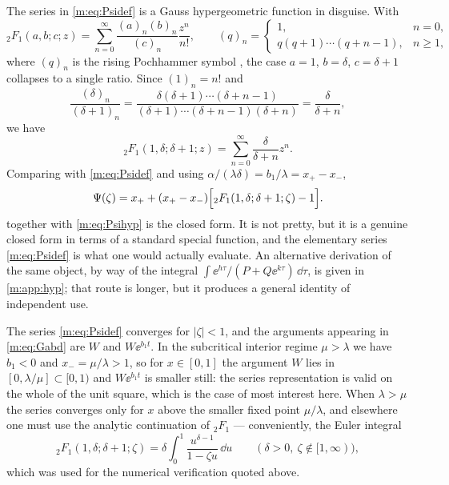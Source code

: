 The series in \cref{m:eq:Psidef} is a Gauss hypergeometric function in disguise. With
\begin{equation}
\label{m:eq:2F1def}
{}_2F_1(a,b;c;z) = \sum_{n=0}^{\infty}\frac{(a)_n(b)_n}{(c)_n}\frac{z^n}{n!},
\qquad
(q)_n = \begin{cases}1, & n=0,\\ q(q+1)\cdots(q+n-1), & n\ge1,\end{cases}
\end{equation}
where $(q)_n$ is the rising Pochhammer symbol \cite{Olver2010}, the case $a=1$,
$b=\delta$, $c=\delta+1$ collapses to a single ratio. Since $(1)_n = n!$ and
\begin{equation}
\label{m:eq:pochcancel}
\frac{(\delta)_n}{(\delta+1)_n}
= \frac{\delta(\delta+1)\cdots(\delta+n-1)}{(\delta+1)\cdots(\delta+n-1)(\delta+n)}
= \frac{\delta}{\delta+n},
\end{equation}
we have
\begin{equation}
\label{m:eq:2F1simple}
{}_2F_1(1,\delta;\delta+1;z) = \sum_{n=0}^{\infty}\frac{\delta}{\delta+n}z^n .
\end{equation}
Comparing with \cref{m:eq:Psidef} and using
$\alpha/(\lambda\delta) = b_1/\lambda = x_+-x_-$,
\begin{equation}
\label{m:eq:Psihyp}
\Psi(\zeta) = x_+ + (x_+-x_-)\Bigl[{}_2F_1(1,\delta;\delta+1;\zeta)-1\Bigr] .
\end{equation}
 together with \cref{m:eq:Psihyp} is the closed form. It is not pretty,
but it is a genuine closed form in terms of a standard special function, and the
elementary series \cref{m:eq:Psidef} is what one would actually evaluate. An
alternative derivation of the same object, by way of the integral
$\int\ee^{h\tau}/(P+Q\ee^{k\tau})\,\dd\tau$, is given in \cref{m:app:hyp}; that route
is longer, but it produces a general identity of independent use.

\begin{remark}
\label{m:rem:domain}
The series \cref{m:eq:Psidef} converges for $|\zeta|<1$, and the arguments appearing
in \cref{m:eq:Gabd} are $W$ and $W\ee^{b_1t}$. In the subcritical interior regime
$\mu>\lambda$ we have $b_1<0$ and $x_- = \mu/\lambda>1$, so for $x\in[0,1]$ the
argument $W$ lies in $[0,\lambda/\mu]\subset[0,1)$ and $W\ee^{b_1t}$ is smaller
still: the series representation is valid on the whole of the unit square, which is
the case of most interest here. When $\lambda>\mu$ the series converges only for
$x$ above the smaller fixed point $\mu/\lambda$, and elsewhere one must use the
analytic continuation of ${}_2F_1$ --- conveniently, the Euler integral
\begin{equation*}
{}_2F_1(1,\delta;\delta+1;\zeta) = \delta\int_0^1\frac{u^{\delta-1}}{1-\zeta u}\,\dd u
\qquad(\delta>0,\ \zeta\notin[1,\infty)),
\end{equation*}
which was used for the numerical verification quoted above.
\end{remark}

